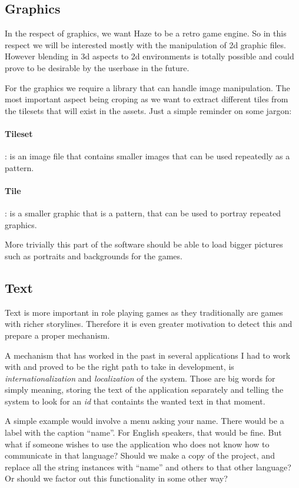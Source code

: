 \subsection{Graphics}

In the respect of graphics, we want Haze to be a retro game engine. So in this
respect we will be interested mostly with the manipulation of 2d graphic files.
However blending in 3d aspects to 2d environments is totally possible and could
prove to be desirable by the userbase in the future.

For the graphics we require a library that can handle image manipulation. The
most important aspect being croping as we want to extract different tiles from
the tilesets that will exist in the assets. Just a simple reminder on some
jargon:

\paragraph{Tileset}: is an image file that contains smaller images that can be
used repeatedly as a pattern.

\paragraph{Tile}: is a smaller graphic that is a pattern, that can be used to
portray repeated graphics.

More trivially this part of the software should be able to load bigger pictures
such as portraits and backgrounds for the games.

\subsection{Text}

Text is more important in role playing games as they traditionally are games
with richer storylines. Therefore it is even greater motivation to detect this
and prepare a proper mechanism.

A mechanism that has worked in the past in several applications I had to work
with and proved to be the right path to take in development, is
\textit{internationalization} and \textit{localization} of the system. Those
are big words for simply meaning, storing the text of the application separately
and telling the system to look for an \textit{id} that containts the wanted
text in that moment.

A simple example would involve a menu asking your name. There would be a label
with the caption ``name''. For English speakers, that would be fine. But what
if someone wishes to use the application who does not know how to communicate
in that language? Should we make a copy of the project, and replace all the
string instances with ``name'' and others to that other language? Or should we
factor out this functionality in some other way?

